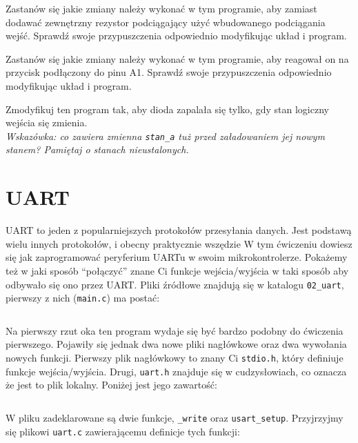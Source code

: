 \documentclass{pdfBooklets}
\begin{document}
\begin{Zadanie}{}{}
  Zastanów się jakie zmiany należy wykonać w tym programie, aby zamiast dodawać zewnętrzny rezystor podciągający użyć wbudowanego podciągania wejść.
  Sprawdź swoje przypuszczenia odpowiednio modyfikując układ i program.
\end{Zadanie}

\begin{Zadanie}{}{}
  Zastanów się jakie zmiany należy wykonać w tym programie, aby reagował on na przycisk podłączony do pinu A1.
  Sprawdź swoje przypuszczenia odpowiednio modyfikując układ i program.
\end{Zadanie}

\begin{Zadanie}{}{}
  Zmodyfikuj ten program tak, aby dioda zapalała się tylko, gdy stan logiczny wejścia się zmienia.\\
  \textit{Wskazówka: co zawiera zmienna \texttt{\Verb$stan_a$} tuż przed załadowaniem jej nowym stanem? Pamiętaj
  o stanach nieustalonych.}
\end{Zadanie}



\section{UART}
UART to jeden z popularniejszych protokołów przesyłania danych. Jest podstawą wielu innych protokołów, i obecny praktycznie wszędzie
W tym ćwiczeniu dowiesz się jak zaprogramować peryferium UARTu w swoim mikrokontrolerze. Pokażemy też w jaki sposób ``połączyć'' znane Ci funkcje
wejścia/wyjścia w taki sposób aby odbywało się ono przez UART. Pliki źródłowe znajdują się w katalogu \Verb$02_uart$, pierwszy z nich (\Verb$main.c$) ma postać:

\inputminted[frame=single,firstline=6]{c}{stm32-examples/02_uart/main.c}

Na pierwszy rzut oka ten program wydaje się być bardzo podobny do ćwiczenia pierwszego. Pojawiły się jednak dwa nowe pliki nagłówkowe
oraz dwa wywołania nowych funkcji. Pierwszy plik nagłówkowy to znany Ci \Verb$stdio.h$, który definiuje funkcje wejścia/wyjścia. Drugi, \Verb$uart.h$
znajduje się w cudzysłowiach, co oznacza że jest to plik lokalny. Poniżej jest jego zawartość:

\inputminted[frame=single]{c}{stm32-examples/02_uart/uart.h}

W pliku zadeklarowane są dwie funkcje, \Verb$_write$ oraz \Verb$usart_setup$. Przyjrzyjmy się plikowi \Verb$uart.c$ zawierającemu definicje tych funkcji:
\end{document}
